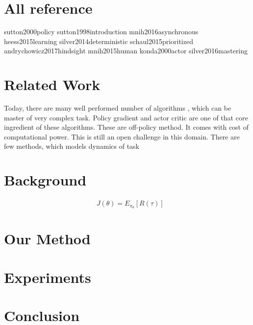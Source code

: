 \documentclass[conference]{IEEEtran}
\begin{document}
\section{All reference}
sutton2000policy
sutton1998introduction
mnih2016asynchronous
heess2015learning
silver2014deterministic
schaul2015prioritized
andrychowicz2017hindsight
mnih2015human
konda2000actor
silver2016mastering

\section{Related Work}
Today, there are many well performed number of algorithms \cite{mnih2015human}\cite{mnih2016asynchronous}\cite{silver2014deterministic}\cite{silver2016mastering}\cite{schaul2015prioritized}\cite{andrychowicz2017hindsight}\cite{heess2015learning}, which can be master of very complex task. Policy gradient \cite{sutton2000policy} and actor critic \cite{konda2000actor} are one of that core ingredient of these algorithms. These are off-policy method. It comes with cost of computational power. This is still an open challenge in this domain. There are few methods, which models dynamics of task

\section{Background}


\begin{align}
&J(\theta) = E_{\pi_\theta}[R(\tau)]
\end{align}



\section{Our Method}


\section{Experiments}


\section{Conclusion}








\end{document}
